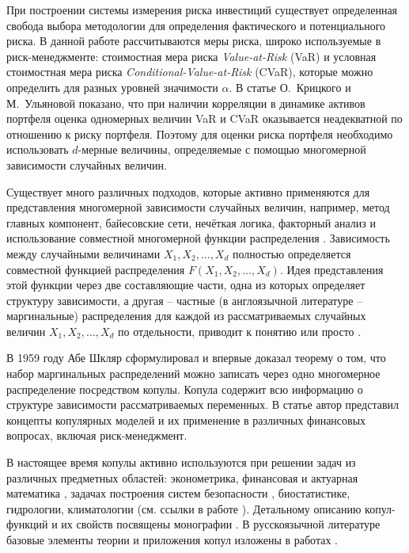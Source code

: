 При построении системы измерения риска инвестиций существует определенная свобода выбора методологии для определения фактического и потенциального риска.
В данной работе рассчитываются  меры риска, широко используемые в риск-менеджменте:  стоимостная мера риска \textit{Value-at-Risk} (VaR) и условная  стоимостная мера риска \textit{Conditional-Value-at-Risk} (CVaR), которые можно определить для разных уровней значимости $\alpha$.  
В статье О.~Крицкого и М.~Ульяновой \cite{Kritski2007} показано, что при наличии корреляции в динамике активов портфеля оценка одномерных величин VaR и CVaR оказывается неадекватной по отношению к риску портфеля. 
Поэтому для оценки риска портфеля необходимо использовать $d$-мерные величины, определяемые с помощью многомерной зависимости случайных величин.

Существует много различных подходов, которые активно применяются для представления многомерной зависимости случайных величин, например, метод главных компонент, байесовские сети, нечёткая логика, факторный анализ и использование совместной многомерной функции распределения \cite{Huynh2014, Kole2007}. 
Зависимость между случайными величинами $X_1, X_2, \ldots, X_d$ полностью определяется совместной функцией распределения $F(X_1, X_2, \ldots, X_d)$. 
Идея представления этой функции через две составляющие части, одна из которых определяет структуру зависимости, а другая --  частные (в англоязычной литературе -- маргинальные) распределения для каждой из рассматриваемых случайных величин
$X_1, X_2, \ldots, X_d$ по отдельности, приводит к понятию  или просто .

В 1959 году Абе Шкляр \cite{Sklar1959} сформулировал и впервые доказал теорему о том, что набор маргинальных распределений можно записать через одно многомерное распределение посредством копулы. 
Копула содержит всю информацию о структуре зависимости рассматриваемых переменных. 
В статье \cite{Penikas2010} автор представил концепты копулярных моделей и их применение в различных финансовых вопросах, включая риск-менеджмент.

В настоящее время копулы активно используются при решении задач из
различных предметных областей: эконометрика, финансовая и
актуарная математика \cite{Penikas2010, Penikas2014, Travkin2013, Knyazev2016, Atskanov2016, Antonov2016, Shemyakin2017}, задачах построения систем
безопасности \cite{Sundaresan2011}, биостатистике, гидрологии,
климатологии (см. ссылки в работе \cite{Fantazzini2011}).
Детальному описанию копул-функций и их свойств посвящены
монографии \cite{Joe2014, Nelsen1999}. В русскоязычной литературе
базовые элементы теории и приложения копул изложены в работах
\cite{Fantazzini2011, Blago2012}.

